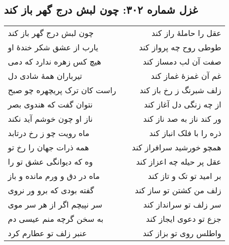 \begin{center}
\section*{غزل شماره ۳۰۲: چون لبش درج گهر باز کند}
\label{sec:302}
\begin{longtable}{l p{0.5cm} r}
چون لبش درج گهر باز کند
&&
عقل را حاملهٔ راز کند
\\
یارب از عشق شکر خندهٔ او
&&
طوطی روح چه پرواز کند
\\
هیچ کس زهره ندارد که دمی
&&
صفت آن لب دمساز کند
\\
تیرباران همهٔ شادی دل
&&
غم آن غمزهٔ غماز کند
\\
راست کان ترک پریچهره چو صبح
&&
زلف شبرنگ ز رخ باز کند
\\
نتوان گفت که هندوی بصر
&&
از چه زنگی دل آغاز کند
\\
ناز او چون خوشم آید نکند
&&
ور کند ناز به صد ناز کند
\\
ماه رویت چو ز رخ درتابد
&&
ذره را با فلک انباز کند
\\
همه ذرات جهان را رخ تو
&&
همچو خورشید سرافراز کند
\\
وه که دیوانگی عشق تو را
&&
عقل پر حیله چه اعزاز کند
\\
ماه در دق و ورم مانده و باز
&&
بر امید تو تک و تاز کند
\\
گفته بودی که برو ور نروی
&&
زلف من کشتن تو ساز کند
\\
سر نپیچم اگر از هر سر موی
&&
سر زلف تو سرانداز کند
\\
به سخن گرچه منم عیسی دم
&&
جزع تو دعوی ایجاز کند
\\
عنبر زلف تو عطارم کرد
&&
واطلس روی تو بزاز کند
\\
\end{longtable}
\end{center}
